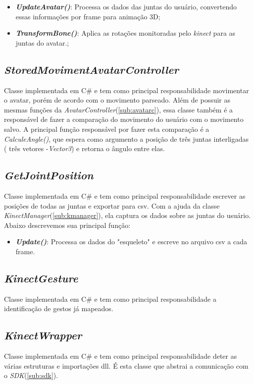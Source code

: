   \begin{itemize}
      \item \textit{\textbf{UpdateAvatar()}}: Processa os dados das juntas do usuário, convertendo essas informações por frame para animação 3D;
      \item \textit{\textbf{TransformBone()}}: Aplica as rotações monitoradas pelo \textit{kinect} para as juntas do avatar.;

  \end{itemize}

  \subsection{\textit{StoredMovimentAvatarController}}\label{sub:storedavatarc}
    Classe implementada em C\# e tem como principal responsabilidade movimentar o avatar, porém de acordo com o movimento parseado. Além de possuir as mesmas funções da
  \textit{AvatarController}(\ref{sub:avatarc}), essa classe também é a responsável de fazer a comparação do movimento do usuário com o movimento salvo. A principal função
  responsável por fazer esta comparação é a \textit{CalculeAngle()}, que espera como argumento a posição de três juntas interligadas ( três vetores -\textit{Vector3}) e retorna o ângulo entre elas.

  \subsection{\textit{GetJointPosition}}\label{sub:getjoint}
    Classe implementada em C\# e tem como principal responsabilidade escrever as posições de todas as juntas e exportar para csv. Com a ajuda da classe \textit{KinectManager}(\ref{sub:kmanager}),
    ela captura os dados sobre as juntas do usuário. Abaixo descrevemos sua principal função:

    \begin{itemize}
        \item \textit{\textbf{Update()}}: Processa os dados do "esqueleto" e escreve no arquivo csv a cada frame.
    \end{itemize}

  \subsection{\textit{KinectGesture}}\label{sub:kgesture}
    Classe implementada em C\# e tem como principal responsabilidade a identificação de gestos já mapeados.

  \subsection{\textit{KinectWrapper}}\label{sub:kwrapper}
    Classe implementada em C\# e tem como principal responsabilidade deter as várias estruturas e importações dll. É esta classe que abstrai a comunicação com o
    \textit{SDK}(\ref{sub:sdk}).

